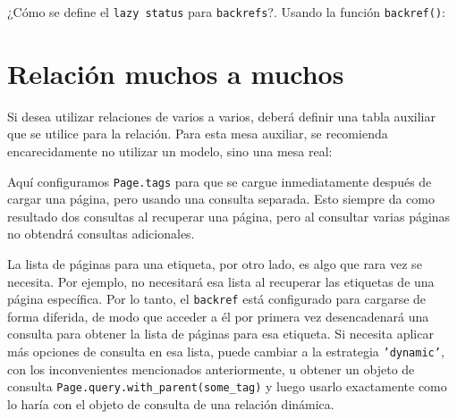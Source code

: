 \documentclass[10pt,letterpaper,notumble]{leaflet}
\begin{document}
{\begin{minipage}{2.2\linewidth}
			¿Cómo se define el \texttt{lazy status} para \texttt{backrefs}?. Usando la función \texttt{backref()}:
			
				
			
			\vspace*{-0.6cm}
			
			\section{Relación muchos a muchos}
			
			Si desea utilizar relaciones de varios a varios, deberá definir una tabla auxiliar que se utilice para la relación. Para esta mesa auxiliar, se recomienda encarecidamente no utilizar un modelo, sino una mesa real:
			
			
			
			
			Aquí configuramos \texttt{Page.tags} para que se cargue inmediatamente después de cargar una página, pero usando una consulta separada. Esto siempre da como resultado dos consultas al recuperar una página, pero al consultar varias páginas no obtendrá consultas adicionales.
			
		\end{minipage}
		
	}

    \clearpage
    
    \mbox{}
    
	\clearpage %
	
	La lista de páginas para una etiqueta, por otro lado, es algo que rara vez se necesita. Por ejemplo, no necesitará esa lista al recuperar las etiquetas de una página específica. Por lo tanto, el \texttt{backref} está configurado para cargarse de forma diferida, de modo que acceder a él por primera vez desencadenará una consulta para obtener la lista de páginas para esa etiqueta. Si necesita aplicar más opciones de consulta en esa lista, puede cambiar a la estrategia \texttt{'dynamic'}, con los inconvenientes mencionados anteriormente, u obtener un objeto de consulta \texttt{Page.query.with\_parent(some\_tag)} y luego usarlo exactamente como lo haría con el objeto de consulta de una relación dinámica.
	
	\clearpage %
	
\end{document}

